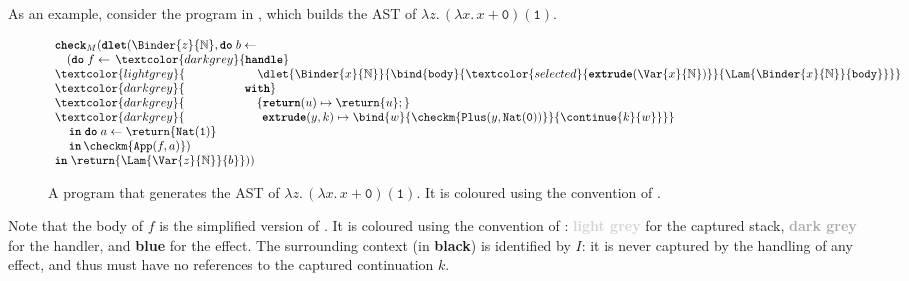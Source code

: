 As an example, consider the program in , which builds the AST of $\lambda z. \, (\lambda x. \, x + \texttt{0}) (\texttt{1})$.
\begin{figure}
\[\begin{array}{l}
  \textbf{\texttt{check}}_M(\textbf{\texttt{dlet}}(\Binder{z}{\mathbb{N}}, \textbf{\texttt{do}} \; b \leftarrow \, \\ 
  \quad (\textbf{\texttt{do}} \; f \leftarrow \, \textcolor{darkgrey}{\textbf{\texttt{handle}}} \\
  \textcolor{lightgrey}{\;\;\;\,\quad \quad \quad\quad\quad {\dlet{\Binder{x}{\mathbb{N}}}{
  \bind{\texttt{body}}{\textcolor{selected}{\textbf{\texttt{extrude}}(\Var{x}{\mathbb{N}})}}{\Lam{\Binder{x}{\mathbb{N}}}{\texttt{body}}}}}} \\ 
  \textcolor{darkgrey}{\;\;\;\,\quad \quad\quad\quad \textbf{\texttt{with}}} \\ 
  \textcolor{darkgrey}{\;\;\;\,\quad \quad\quad\quad \quad \{ \textbf{\texttt{return}}(u) \mapsto {\return{u}};} \\ 
  \textcolor{darkgrey}{\;\;\;\, \quad \quad\quad\quad \quad \;\, \textbf{\texttt{extrude}}(y, k) \mapsto {\bind{w}{\checkm{\texttt{Plus}(y, \texttt{Nat}(\texttt{0}))}}{\continue{k}{w}}}\}} \\ 
  \, \quad \textbf{\texttt{in}} \; \textbf{\texttt{do}} \; {a}\leftarrow {\return{\texttt{Nat}(\texttt{1})}}\\
  \, \quad \textbf{\texttt{in}} \, {\checkm{\texttt{App}(f, a)}})\; \\
  \textbf{\texttt{in}} \; \return{\Lam{\Var{z}{\mathbb{N}}}{b}})) 
\end{array}\]
\caption{A \coreLang{} program that generates the AST of $\lambda z. \, (\lambda x. \, x + \texttt{0}) (\texttt{1})$. It is coloured using the convention of .}
\label{fig:core-unmute-example}
\end{figure}
Note that the body of $f$ is the simplified version of . It is coloured using the convention of : \textbf{\textcolor{lightgrey}{light grey}} for the captured stack, \textbf{\textcolor{darkgrey}{dark grey}} for the handler, and \textbf{\textcolor{selected}{blue}} for the effect. The surrounding context (in \textbf{black}) is identified by $I$: it is never captured by the handling of any effect, and thus must have no references to the captured continuation $k$.

